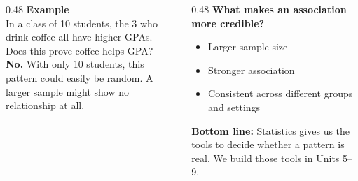 \documentclass[aspectratio=169, 11pt]{beamer}
\begin{document}
{
\begin{frame}[t, plain]
  \vspace{1.05cm}\par
  \hspace{0.4cm}%
  \begin{minipage}{0.93\textwidth}
    \vspace{1em}
    \small
    \begin{columns}[T]

      \begin{column}{0.48\textwidth}
        \textbf{\color{greenacc}Example}\\[4pt]
        In a class of 10 students, the 3 who drink coffee
        all have higher GPAs.\\[8pt]
        Does this prove coffee helps GPA?\\[4pt]
        \textbf{No.} With only 10 students, this pattern
        could easily be random. A larger sample
        might show no relationship at all.
      \end{column}

      \begin{column}{0.48\textwidth}
        \textbf{\color{greenacc}What makes an association more credible?}
        \begin{itemize}
          \setlength{\itemsep}{0.3em}
          \item Larger sample size
          \item Stronger association
          \item Consistent across different groups and settings
        \end{itemize}
        \vspace{8pt}
        \textbf{Bottom line:} Statistics gives us the tools to decide
        whether a pattern is real. We build those tools in Units 5--9.
      \end{column}

    \end{columns}
  \end{minipage}
\end{frame}
}
\end{document}
